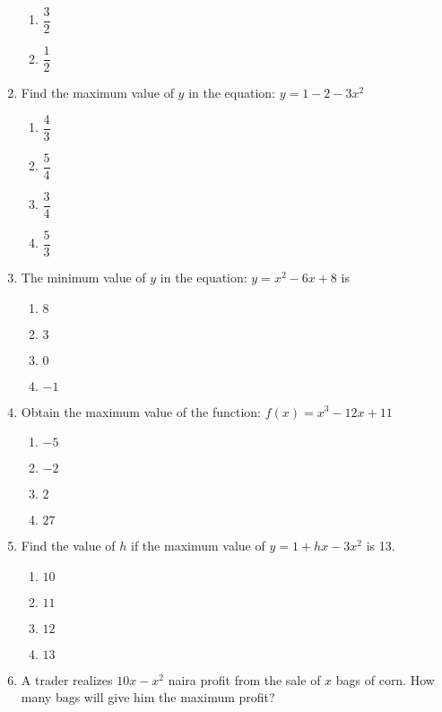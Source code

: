 \begin{multicols}{2}
\begin{enumerate}[label={\arabic*.}]
\begin{enumerate}[label={\Alph*.}]
            \item \(\dfrac{3}{2}\)
            \item \(\dfrac{1}{2}\)
        \end{enumerate}
  \item Find the maximum value of \(y\) in the equation: \(y = 1 - 2 - 3{x}^{2}\)
        \begin{enumerate}[label={\Alph*.}]
            \item \(\dfrac{4}{3}\)
            \item \(\dfrac{5}{4}\)
            \item \(\dfrac{3}{4}\)
            \item \(\dfrac{5}{3}\)
        \end{enumerate}
  \item The minimum value of \(y\) in the equation: \(y = {x}^{2} - 6x + 8\) is
        \begin{enumerate}[label={\Alph*.}]
            \item \(8\)
            \item \(3\)
            \item \(0\)
            \item \(-1\)
        \end{enumerate}
  \item Obtain the maximum value of the function: \(f(x) = {x}^{3} - 12x + 11\)
        \begin{enumerate}[label={\Alph*.}]
            \item \(-5\)
            \item \(-2\)
            \item \(2\)
            \item \(27\)
        \end{enumerate}
  \item Find the value of \(h\) if the maximum value of \(y = 1 + hx - 3{x}^{2}\) is 13.
        \begin{enumerate}[label={\Alph*.}]
            \item \(10\)
            \item \(11\)
            \item \(12\)
            \item \(13\)
        \end{enumerate}
  \item A trader realizes \(10x - {x}^{2}\) naira profit from the sale of \(x\) bags of corn. How many bags will give him the maximum profit?
        \begin{enumerate}[label={\Alph*.}]

\end{enumerate}
\end{enumerate}
\end{multicols}
